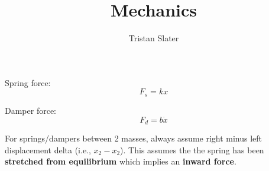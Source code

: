 \documentclass{article}
\title{Mechanics}
\author{Tristan Slater}
\begin{document}
    \maketitle

    Spring force: \begin{equation}
        F_s = kx
    \end{equation}

    Damper force: \begin{equation}
        F_d = b\dot{x}
    \end{equation}

    For springs/dampers between 2 masses, always assume right minus left displacement delta (i.e., $x_2 - x_2$). This assumes the the spring has been \textbf{stretched from equilibrium} which implies an \textbf{inward force}.
\end{document}

